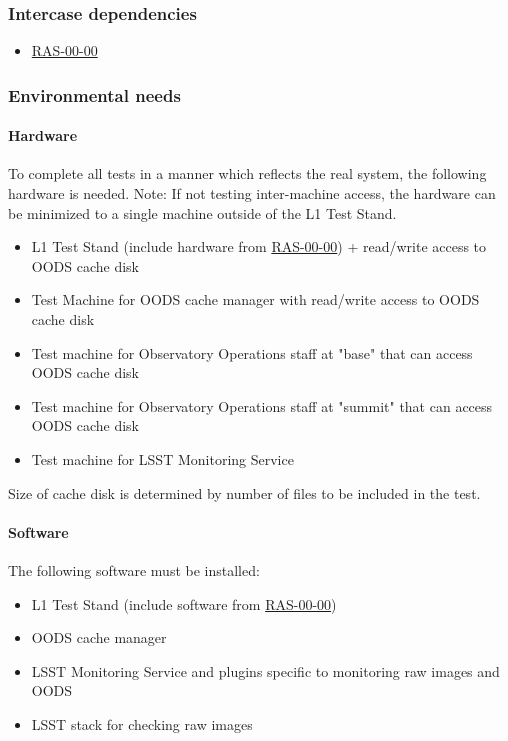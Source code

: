 \documentclass[DM,lsstdraft,STS,toc]{lsstdoc}
\begin{document}
\subsubsection{Intercase dependencies}
\begin{itemize}
\item{\hyperref[ras-00-00]{RAS-00-00}}
\end{itemize}


\subsubsection{Environmental needs}
\paragraph{Hardware}


To complete all tests in a manner which reflects the real system,
the following hardware is needed.  Note: If not testing inter-machine access, the hardware can be minimized to a single machine outside of the L1 Test Stand.


\begin{itemize}
\item{L1 Test Stand (include hardware from \hyperref[ras-00-00]{RAS-00-00}) + read/write access to OODS cache disk}
\item{Test Machine for OODS cache manager with read/write access to OODS cache disk}
\item{Test machine for Observatory Operations staff at "base" that can access OODS cache disk}
\item{Test machine for Observatory Operations staff at "summit" that can access OODS cache disk}
\item{Test machine for LSST Monitoring Service}
\end{itemize}


Size of cache disk is determined by number of files to be included in the test.






\paragraph{Software}


The following software must be installed:
\begin{itemize}
\item{L1 Test Stand (include software from \hyperref[ras-00-00]{RAS-00-00})}
\item{OODS cache manager}
\item{LSST Monitoring Service and plugins specific to monitoring raw images and OODS}
\item{LSST stack for checking raw images}
\end{itemize}
\end{document}
